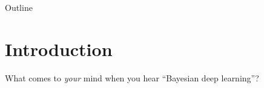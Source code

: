 \documentclass[9pt]{beamer}
\begin{document}
\begin{frame}
\maketitle
\end{frame}


\begin{frame}{Outline}
	\tableofcontents[pausesections,subsectionstyle=hide,subsubsectionstyle=hide]
\end{frame}


\section{Introduction}

\begin{frame}{What comes to \emph{your} mind when you hear ``Bayesian deep learning''?}
\end{frame}

\end{document}
